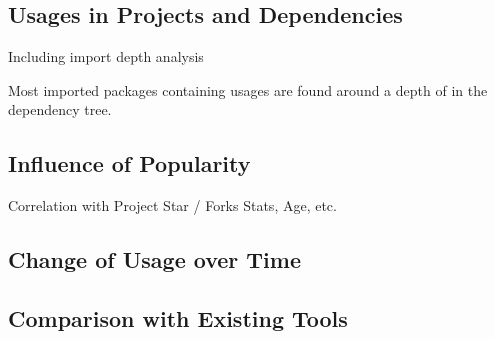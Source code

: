 
\subsection{Usages in Projects and Dependencies}\label{subsec:go-geiger:evaluation:unsafe-usage}

Including import depth analysis





\begin{tcolorbox}[boxsep=1pt, enlarge top by=5pt, title=Answer to \ref{rq:depsDepth}]
    Most imported packages containing \unsafe{} usages are found around a depth of  in the dependency tree.
\end{tcolorbox}



\subsection{Influence of Popularity}\label{subsec:go-geiger:evaluation:popularity}

Correlation with Project Star / Forks Stats, Age, etc.




\subsection{Change of Usage over Time}\label{subsec:go-geiger:evaluation:over-time}





\subsection{Comparison with Existing Tools}\label{subsec:go-geiger:evaluation:linters-comparison}

